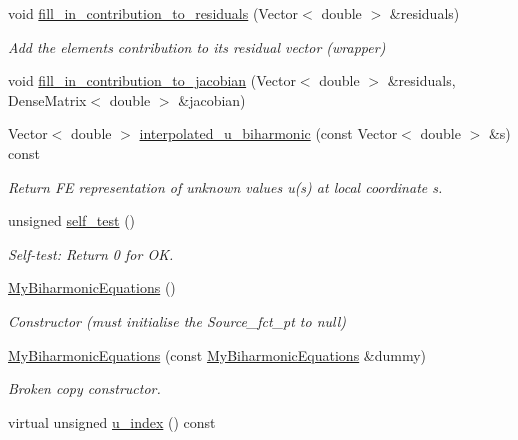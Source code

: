 \begin{DoxyCompactItemize}
\item 
void \hyperlink{classoomph_1_1MyBiharmonicEquations_a2f795bb316c3a9fc749639a8d3f8b5dd}{fill\+\_\+in\+\_\+contribution\+\_\+to\+\_\+residuals} (Vector$<$ double $>$ \&residuals)
\begin{DoxyCompactList}\small\item\em Add the element\textquotesingle{}s contribution to its residual vector (wrapper) \end{DoxyCompactList}\item 
void \hyperlink{classoomph_1_1MyBiharmonicEquations_ad5ef6af62c0ebf27bacf62be8d408c8a}{fill\+\_\+in\+\_\+contribution\+\_\+to\+\_\+jacobian} (Vector$<$ double $>$ \&residuals, Dense\+Matrix$<$ double $>$ \&jacobian)
\item 
Vector$<$ double $>$ \hyperlink{classoomph_1_1MyBiharmonicEquations_ac451e7d6ebf1dd94f0a0c122e3882d53}{interpolated\+\_\+u\+\_\+biharmonic} (const Vector$<$ double $>$ \&s) const
\begin{DoxyCompactList}\small\item\em Return FE representation of unknown values u(s) at local coordinate s. \end{DoxyCompactList}\item 
unsigned \hyperlink{classoomph_1_1MyBiharmonicEquations_a6898ff065e57f8e765440da81075cf3d}{self\+\_\+test} ()
\begin{DoxyCompactList}\small\item\em Self-\/test\+: Return 0 for OK. \end{DoxyCompactList}\item 
\hyperlink{classoomph_1_1MyBiharmonicEquations_ab5084decf9d75cee91f0e88fb4f62c86}{My\+Biharmonic\+Equations} ()
\begin{DoxyCompactList}\small\item\em Constructor (must initialise the Source\+\_\+fct\+\_\+pt to null) \end{DoxyCompactList}\item 
\hyperlink{classoomph_1_1MyBiharmonicEquations_a3cf0e0a63e46219b94195aa4ab926316}{My\+Biharmonic\+Equations} (const \hyperlink{classoomph_1_1MyBiharmonicEquations}{My\+Biharmonic\+Equations} \&dummy)
\begin{DoxyCompactList}\small\item\em Broken copy constructor. \end{DoxyCompactList}\item 
virtual unsigned \hyperlink{classoomph_1_1MyBiharmonicEquations_a541bbdb24f7849dd5c5a20f3d132a04b}{u\+\_\+index} () const

\end{DoxyCompactItemize}
